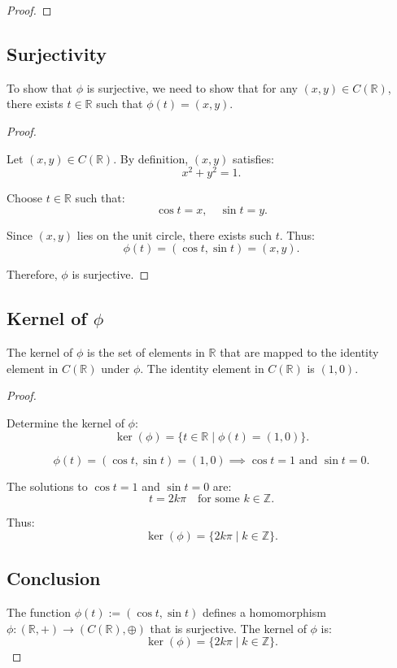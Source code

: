 \documentclass[12pt]{amsart}
\theoremstyle{definition}
\numberwithin{equation}{section}
\newcommand{\Z}{\mathbb{Z}}
\newcommand{\R}{\mathbb{R}}
\begin{document}
\begin{exercise}{5}
\begin{proof}
    \end{proof}
    
    \subsection*{Surjectivity}
    
    To show that \(\phi\) is surjective, we need to show that for any \((x, y) \in C(\R)\), there exists \(t \in \R\) such that \(\phi(t) = (x, y)\).
    
    \begin{proof} \( \)
    
    Let \((x, y) \in C(\R)\). By definition, \((x, y)\) satisfies:
    \[
    x^2 + y^2 = 1.
    \]
    
    Choose \(t \in \R\) such that:
    \[
    \cos t = x, \quad \sin t = y.
    \]
    
    Since \((x, y)\) lies on the unit circle, there exists such \(t\). Thus:
    \[
    \phi(t) = (\cos t, \sin t) = (x, y).
    \]
    
    Therefore, \(\phi\) is surjective.
    
    \end{proof}
    
    \subsection*{Kernel of \(\phi\)}
    
    The kernel of \(\phi\) is the set of elements in \(\R\) that are mapped to the identity element in \(C(\R)\) under \(\phi\). The identity element in \(C(\R)\) is \((1, 0)\).
    
    \begin{proof} \( \)
    
    Determine the kernel of \(\phi\):
    \[
    \ker(\phi) = \{t \in \R \mid \phi(t) = (1, 0)\}.
    \]
    
    \[
    \phi(t) = (\cos t, \sin t) = (1, 0) \implies \cos t = 1 \text{ and } \sin t = 0.
    \]
    
    The solutions to \(\cos t = 1\) and \(\sin t = 0\) are:
    \[
    t = 2k\pi \quad \text{for some } k \in \Z.
    \]
    
    Thus:
    \[
    \ker(\phi) = \{2k\pi \mid k \in \Z\}.
    \]
    
    
    \subsection*{Conclusion}
    
    The function \(\phi(t) := (\cos t, \sin t)\) defines a homomorphism \(\phi: (\R, +) \rightarrow (C(\R), \oplus)\) that is surjective. The kernel of \(\phi\) is:
    \[
        \ker(\phi) = \{2k\pi \mid k \in \Z\}.
        \]
        
    \end{proof}
    \end{exercise}
    \newpage
    

\end{document}

